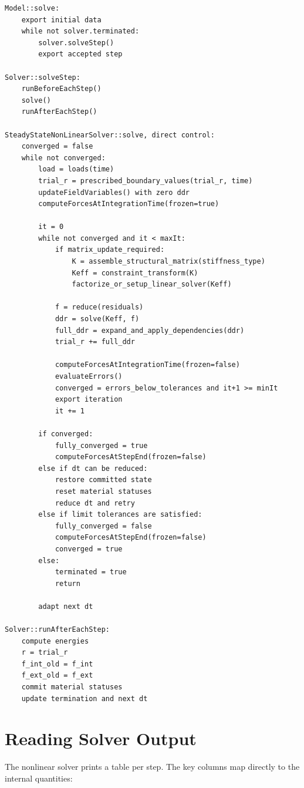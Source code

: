 \documentclass[11pt,a4paper]{article}
\begin{document}
\begin{Verbatim}[fontsize=\small, frame=single]
Model::solve:
    export initial data
    while not solver.terminated:
        solver.solveStep()
        export accepted step

Solver::solveStep:
    runBeforeEachStep()
    solve()
    runAfterEachStep()

SteadyStateNonLinearSolver::solve, direct control:
    converged = false
    while not converged:
        load = loads(time)
        trial_r = prescribed_boundary_values(trial_r, time)
        updateFieldVariables() with zero ddr
        computeForcesAtIntegrationTime(frozen=true)

        it = 0
        while not converged and it < maxIt:
            if matrix_update_required:
                K = assemble_structural_matrix(stiffness_type)
                Keff = constraint_transform(K)
                factorize_or_setup_linear_solver(Keff)

            f = reduce(residuals)
            ddr = solve(Keff, f)
            full_ddr = expand_and_apply_dependencies(ddr)
            trial_r += full_ddr

            computeForcesAtIntegrationTime(frozen=false)
            evaluateErrors()
            converged = errors_below_tolerances and it+1 >= minIt
            export iteration
            it += 1

        if converged:
            fully_converged = true
            computeForcesAtStepEnd(frozen=false)
        else if dt can be reduced:
            restore committed state
            reset material statuses
            reduce dt and retry
        else if limit tolerances are satisfied:
            fully_converged = false
            computeForcesAtStepEnd(frozen=false)
            converged = true
        else:
            terminated = true
            return

        adapt next dt

Solver::runAfterEachStep:
    compute energies
    r = trial_r
    f_int_old = f_int
    f_ext_old = f_ext
    commit material statuses
    update termination and next dt
\end{Verbatim}

\section{Reading Solver Output}

The nonlinear solver prints a table per step.  The key columns map directly to
the internal quantities:
\end{document}
